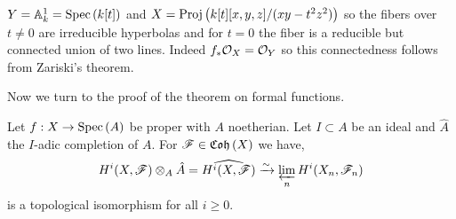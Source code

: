 \documentclass[12pt]{article}
\begin{document}
\begin{example}
$Y = \mathbb{A}^1_k = \mathrm{Spec}\left( k[t] \right)$ and $X = \mathrm{Proj}\left( k[t][x,y,z]/(xy - t^2 z^2) \right)$ so the fibers over $t \neq 0$ are irreducible hyperbolas and for $t = 0$ the fiber is a reducible but connected union of two lines. Indeed $f_* \mathcal{O}_{X} = \mathcal{O}_{Y}$ so this connectedness follows from Zariski's theorem.  
\end{example}

\begin{rmk}
Now we turn to the proof of the theorem on formal functions.
\end{rmk}

\begin{theorem}
Let $f : X \to \mathrm{Spec}\left( A \right)$ be proper with $A$ noetherian. Let $I \subset A$ be an ideal and $\hat{A}$ the $I$-adic completion of $A$. For $\mathscr{F} \in \mathfrak{Coh}\left(X\right)$ we have,
\[ H^i(X, \mathscr{F}) \otimes_A \hat{A} = \widehat{H^i(X, \mathscr{F})} \xrightarrow{\sim} \varprojlim_n H^i(X_n, \mathscr{F}_n) \]
is a topological isomorphism for all $i \ge 0$. 
\end{theorem}
\end{document}
